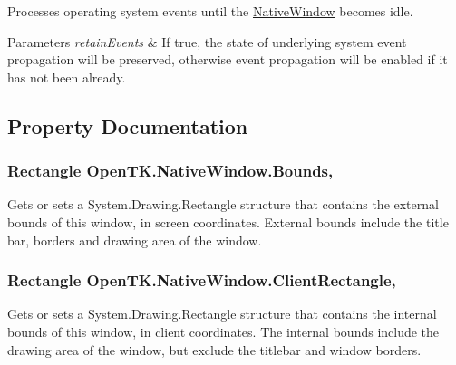 Processes operating system events until the \hyperlink{class_open_t_k_1_1_native_window}{Native\-Window} becomes idle. 


\begin{DoxyParams}{Parameters}
{\em retain\-Events} & If true, the state of underlying system event propagation will be preserved, otherwise event propagation will be enabled if it has not been already.\\
\hline
\end{DoxyParams}


\subsection{Property Documentation}
\hypertarget{class_open_t_k_1_1_native_window_ac0325973134062eba62484df45236464}{
\subsubsection[{Bounds}]{\setlength{\rightskip}{0pt plus 5cm}Rectangle Open\-T\-K.\-Native\-Window.\-Bounds\hspace{0.3cm}{\ttfamily [get]}, {\ttfamily [set]}}}\label{class_open_t_k_1_1_native_window_ac0325973134062eba62484df45236464}


Gets or sets a System.\-Drawing.\-Rectangle structure that contains the external bounds of this window, in screen coordinates. External bounds include the title bar, borders and drawing area of the window. 

\hypertarget{class_open_t_k_1_1_native_window_a397e3c3a3a98d0660bd9463090422bf6}{
\subsubsection[{Client\-Rectangle}]{\setlength{\rightskip}{0pt plus 5cm}Rectangle Open\-T\-K.\-Native\-Window.\-Client\-Rectangle\hspace{0.3cm}{\ttfamily [get]}, {\ttfamily [set]}}}\label{class_open_t_k_1_1_native_window_a397e3c3a3a98d0660bd9463090422bf6}


Gets or sets a System.\-Drawing.\-Rectangle structure that contains the internal bounds of this window, in client coordinates. The internal bounds include the drawing area of the window, but exclude the titlebar and window borders. 

